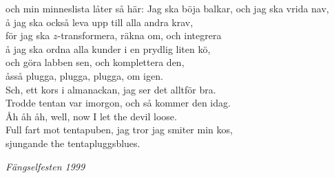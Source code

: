 \documentclass[a6paper,10pt]{article}
\begin{document}
och min minneslista låter så här:
\newpage
\setlength{\oddsidemargin}{-0.37in}
\noindent
Jag ska böja balkar, och jag ska vrida nav, \\
å jag ska också leva upp till alla andra krav, \\
för jag ska  $z$-transformera, räkna om, och integrera \\
å jag ska ordna alla kunder i en prydlig liten kö, \\
och göra labben sen, och komplettera den, \\
åsså plugga, plugga, plugga, om igen.
\vspace{5pt} \\
Sch, ett kors i almanackan, jag ser det alltför bra. \\
Trodde tentan var imorgon, och så kommer den idag. \\
Åh åh åh, well, now I let the devil loose. \\
Full fart mot tentapuben, jag tror jag smiter min kos, \\
sjungande the tentapluggsblues. 
\begin{flushright}
\textit{Fängselfesten 1999}
\end{flushright}
\end{document}
